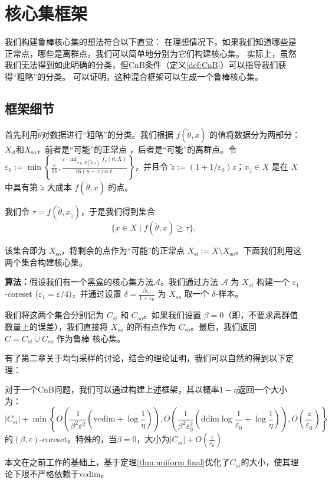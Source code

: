 \chapter{核心集框架}

我们构建鲁棒核心集的想法符合以下直觉：
在理想情况下，如果我们知道哪些是正常点，哪些是离群点，我们可以简单地分别为它们构建核心集。
实际上，虽然我们无法得到如此明确的分类，但CnB条件（定义\ref{def:CnB}）可以指导我们获得“粗略”的分类。
可以证明\cite{Wang2021RobustAF}，这种混合框架可以生成一个鲁棒核心集。

\section{框架细节}

首先利用$\tilde{\theta}$对数据进行“粗略”的分类。我们根据 $f(\tilde{\theta}, x)$ 的值将数据分为两部分：$X_{\text{si}}$和$X_{\text{so}}$，前者是“可能”的正常点
，后者是“可能”的离群点。令 $\varepsilon_0 := \min \left\{ \frac{\varepsilon}{16}, \frac{\varepsilon \cdot \inf_{\theta \in \mathcal{B}(\tilde{\theta}, \varepsilon)} f_z(\theta, X)}{16(n - z) \alpha \ell} \right\}$，并且令 $\tilde{z} := (1 + 1/\varepsilon_0) z$；$x_{\tilde{z}} \in X$ 是在 $X$ 中具有第 $\tilde{z}$ 大成本 $f(\tilde{\theta}, x)$ 的点。

我们令 $\tau = f(\tilde{\theta}, x_{\tilde{z}})$，于是我们得到集合
\begin{equation}
\{ x \in X \mid f(\tilde{\theta}, x) \geq \tau \}.
\end{equation}

该集合即为 $X_{\text{so}}$，将剩余的点作为“可能”的正常点 $X_{\text{si}} := X \setminus X_{\text{so}}$。下面我们利用这两个集合构建核心集。

\textbf{算法：}假设我们有一个黑盒的核心集方法$\mathcal{A}$。我们通过方法 $\mathcal{A}$ 为 $X_{si}$ 构建一个 $\varepsilon_1$-coreset ($\varepsilon_1 = \varepsilon / 4$)，并通过设置 $\delta = \frac{\beta \varepsilon_0}{1 + \varepsilon_0}$ 为 $X_{so}$ 取一个 $\delta$-样本。

我们将这两个集合分别记为 $C_{si}$ 和 $C_{so}$。如果我们设置 $\beta = 0$（即，不要求离群值数量上的误差），我们直接将 $X_{so}$ 的所有点作为 $C_{so}$。最后，我们返回 $C = C_{si} \cup C_{so}$ 作为鲁棒 核心集。

有了第二章关于均匀采样的讨论，结合\cite{Wang2021RobustAF}的理论证明，我们可以自然的得到以下定理：
\begin{theorem}
    对于一个CnB问题，我们可以通过构建上述框架，其以概率$1-\eta$返回一个大小为：
    \begin{equation*}
        |C_{si}|+\min\left\{O\left(\frac{1}{\beta^2\varepsilon^2}(\text{vcdim}+\log \frac 1 \eta)\right),O\left(\frac{1}{\beta^2\varepsilon_0^2}(\text{ddim}\log\frac{1}{\varepsilon_0}+\log \frac{1}{\eta})\right),O\left(\frac z {\varepsilon_0}\right)\right\}
    \end{equation*}
的$(\beta,\varepsilon)$-coreset。特殊的，当$\beta = 0$，大小为$|C_{si}|+O\left(\frac{z}{\varepsilon_0}\right)$
\end{theorem}
本文在之前工作的基础上，基于定理\ref{thm:uniform final}优化了$C_{si}$的大小，使其理论下限不严格依赖于vcdim。

